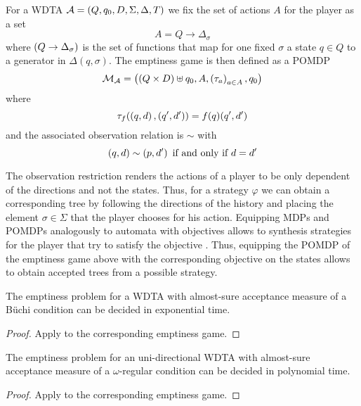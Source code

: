 \begin{definition}
  For a \ac{WDTA} $\mathcal{A} = \left(Q, q_{0}, D, \Sigma, \Delta, T\right)$ we
  fix the set of actions $A$ for the player as a set
  \begin{equation*}
    A = Q\rightarrow\Delta_{\sigma}
  \end{equation*}
  where $\left(Q\rightarrow\Delta_{\sigma}\right)$ is the set of functions that map
  for one fixed $\sigma$ a state $q\in Q$ to a generator in $\Delta(q,\sigma)$.
  The emptiness game is then defined as a \ac{POMDP}
  \begin{equation*}
    \mathcal{M}_{\mathcal{A}} = \left(\left(Q\times D\right)\uplus q_{0}, A,
    \left(\tau_{a}\right)_{a\in A}, q_{0}\right)
  \end{equation*}
  where
  \begin{equation*}
    \tau_{f}(\left(q,d\right),\left(q',d'\right)) = f(q)(q',d')
  \end{equation*}
  and the associated observation relation is $\sim$ with
  \begin{equation*}
    \left(q, d\right)\sim\left(p, d'\right)\text{ if and only if } d = d'
  \end{equation*}
\end{definition}
The observation restriction renders the actions of a player to be only
dependent of the directions and not the states. Thus, for a strategy $\varphi$
we can obtain a corresponding tree by following the directions of the history
and placing the element $\sigma\in\Sigma$ that the player chooses for his
action. Equipping \acp{MDP} and \acp{POMDP} analogously to automata with
objectives allows to synthesis strategies for the player that try to satisfy
the objective \cite{RandAutoInfTrees}. Thus, equipping the \ac{POMDP} of the
emptiness game above with the corresponding objective on the states allows to
obtain accepted trees from a possible strategy.
\begin{corollary}
  The emptiness problem for a \ac{WDTA} with almost-sure acceptance measure of
  a Büchi condition can be decided in exponential time.
  \label{cor:emptiness}
\end{corollary}
\begin{proof}
  Apply \cite[Theorem 5]{QualAnaPOMDP} to the corresponding emptiness game.
\end{proof}
\begin{corollary}
  The emptiness problem for an uni-directional \ac{WDTA} with almost-sure
  acceptance measure of a $\omega$-regular condition can be decided in
  polynomial time.
\end{corollary}
\begin{proof}
  Apply \cite[Theorem 3]{RandAutoInfTrees} to the corresponding emptiness game.
\end{proof}

